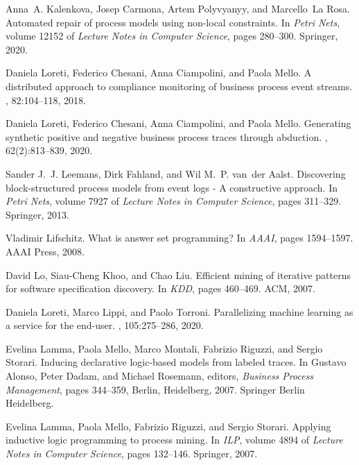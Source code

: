 \documentclass[a4wide,11pt]{article}
\theoremstyle{definition}
\theoremstyle{plain}
\begin{document}
\begin{thebibliography}{MWvdAvdB06}
Anna~A. Kalenkova, Josep Carmona, Artem Polyvyanyy, and Marcello~La Rosa.
\newblock Automated repair of process models using non-local constraints.
\newblock In {\em Petri Nets}, volume 12152 of {\em Lecture Notes in Computer
  Science}, pages 280--300. Springer, 2020.

Daniela Loreti, Federico Chesani, Anna Ciampolini, and Paola Mello.
\newblock A distributed approach to compliance monitoring of business process
  event streams.
, 82:104--118, 2018.

Daniela Loreti, Federico Chesani, Anna Ciampolini, and Paola Mello.
\newblock Generating synthetic positive and negative business process traces
  through abduction.
, 62(2):813--839, 2020.

Sander J.~J. Leemans, Dirk Fahland, and Wil M.~P. van~der Aalst.
\newblock Discovering block-structured process models from event logs - {A}
  constructive approach.
\newblock In {\em Petri Nets}, volume 7927 of {\em Lecture Notes in Computer
  Science}, pages 311--329. Springer, 2013.

Vladimir Lifschitz.
\newblock What is answer set programming?
\newblock In {\em {AAAI}}, pages 1594--1597. {AAAI} Press, 2008.

David Lo, Siau{-}Cheng Khoo, and Chao Liu.
\newblock Efficient mining of iterative patterns for software specification
  discovery.
\newblock In {\em {KDD}}, pages 460--469. {ACM}, 2007.

Daniela Loreti, Marco Lippi, and Paolo Torroni.
\newblock Parallelizing machine learning as a service for the end-user.
, 105:275--286, 2020.

Evelina Lamma, Paola Mello, Marco Montali, Fabrizio Riguzzi, and Sergio
  Storari.
\newblock Inducing declarative logic-based models from labeled traces.
\newblock In Gustavo Alonso, Peter Dadam, and Michael Rosemann, editors, {\em
  Business Process Management}, pages 344--359, Berlin, Heidelberg, 2007.
  Springer Berlin Heidelberg.

Evelina Lamma, Paola Mello, Fabrizio Riguzzi, and Sergio Storari.
\newblock Applying inductive logic programming to process mining.
\newblock In {\em {ILP}}, volume 4894 of {\em Lecture Notes in Computer
  Science}, pages 132--146. Springer, 2007.


\end{thebibliography}
\end{document}
